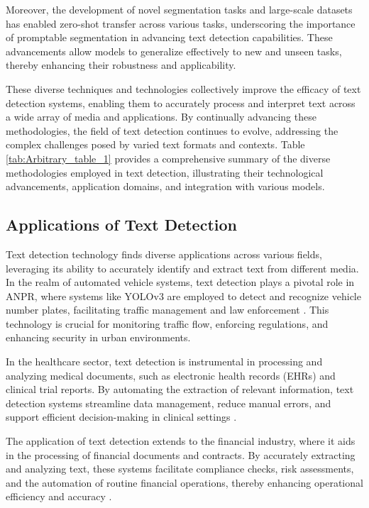 Moreover, the development of novel segmentation tasks and large-scale datasets has enabled zero-shot transfer across various tasks, underscoring the importance of promptable segmentation in advancing text detection capabilities. These advancements allow models to generalize effectively to new and unseen tasks, thereby enhancing their robustness and applicability.

These diverse techniques and technologies collectively improve the efficacy of text detection systems, enabling them to accurately process and interpret text across a wide array of media and applications. By continually advancing these methodologies, the field of text detection continues to evolve, addressing the complex challenges posed by varied text formats and contexts. Table \ref{tab:Arbitrary_table_1} provides a comprehensive summary of the diverse methodologies employed in text detection, illustrating their technological advancements, application domains, and integration with various models.



\subsection{Applications of Text Detection} \label{subsec:Applications of Text Detection}



Text detection technology finds diverse applications across various fields, leveraging its ability to accurately identify and extract text from different media. In the realm of automated vehicle systems, text detection plays a pivotal role in ANPR, where systems like YOLOv3 are employed to detect and recognize vehicle number plates, facilitating traffic management and law enforcement \cite{adak2022automaticnumberplaterecognition}. This technology is crucial for monitoring traffic flow, enforcing regulations, and enhancing security in urban environments.



In the healthcare sector, text detection is instrumental in processing and analyzing medical documents, such as electronic health records (EHRs) and clinical trial reports. By automating the extraction of relevant information, text detection systems streamline data management, reduce manual errors, and support efficient decision-making in clinical settings \cite{quennelle2023smartdataextractorclinician}.



The application of text detection extends to the financial industry, where it aids in the processing of financial documents and contracts. By accurately extracting and analyzing text, these systems facilitate compliance checks, risk assessments, and the automation of routine financial operations, thereby enhancing operational efficiency and accuracy \cite{reddy2024docfinqalongcontextfinancialreasoning}.



